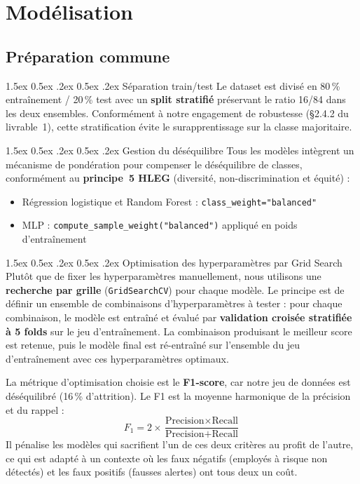 \documentclass[12pt,a4paper]{article}
\makeatletter
\renewcommand\paragraph{\@startsection{paragraph}{4}{\z@}%
  {1.5ex \@plus 0.5ex \@minus .2ex}%
  {0.5ex \@plus .2ex}%
  {\normalfont\normalsize\bfseries}}
\makeatother
\begin{document}
\section{Modélisation}

\subsection{Préparation commune}

\paragraph{Séparation train/test} Le dataset est divisé en 80\,\% entraînement / 20\,\% test avec un \textbf{split stratifié} préservant le ratio 16/84 dans les deux ensembles. Conformément à notre engagement de robustesse (§2.4.2 du livrable~1), cette stratification évite le surapprentissage sur la classe majoritaire.

\paragraph{Gestion du déséquilibre} Tous les modèles intègrent un mécanisme de pondération pour compenser le déséquilibre de classes, conformément au \textbf{principe~5 HLEG} (diversité, non-discrimination et équité) :
\begin{itemize}
    \item Régression logistique et Random Forest : \texttt{class\_weight="balanced"}
    \item MLP : \texttt{compute\_sample\_weight("balanced")} appliqué en poids d'entraînement
\end{itemize}

\paragraph{Optimisation des hyperparamètres par Grid Search} Plutôt que de fixer les hyperparamètres manuellement, nous utilisons une \textbf{recherche par grille} (\texttt{GridSearchCV}) pour chaque modèle. Le principe est de définir un ensemble de combinaisons d'hyperparamètres à tester : pour chaque combinaison, le modèle est entraîné et évalué par \textbf{validation croisée stratifiée à 5 folds} sur le jeu d'entraînement. La combinaison produisant le meilleur score est retenue, puis le modèle final est ré-entraîné sur l'ensemble du jeu d'entraînement avec ces hyperparamètres optimaux.

La métrique d'optimisation choisie est le \textbf{F1-score}, car notre jeu de données est déséquilibré (16\,\% d'attrition). Le F1 est la moyenne harmonique de la précision et du rappel :
$$F_1 = 2 \times \frac{\text{Precision} \times \text{Recall}}{\text{Precision} + \text{Recall}}$$
Il pénalise les modèles qui sacrifient l'un de ces deux critères au profit de l'autre, ce qui est adapté à un contexte où les faux négatifs (employés à risque non détectés) et les faux positifs (fausses alertes) ont tous deux un coût.
\end{document}
